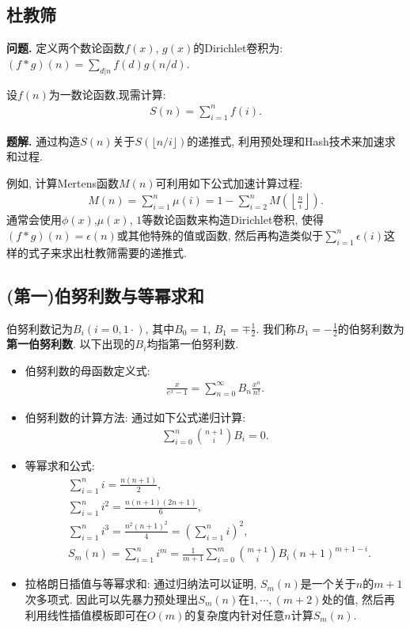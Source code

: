 \subsection{杜教筛}
\textbf{问题.}
定义两个数论函数$f(x)$, $g(x)$的Dirichlet卷积为:
$(f * g)(n) = \sum_{d|n} f(d) g\left( n/d \right)$.

设$f(n)$为一数论函数,现需计算:
\begin{gather*}
    S(n) = \sum_{i=1}^n f(i).
\end{gather*}

\textbf{题解.}
通过构造$S(n)$关于$S(\lfloor n/i \rfloor)$的递推式, 利用预处理和Hash技术来加速求和过程.

例如, 计算Mertens函数$M(n)$可利用如下公式加速计算过程:
\begin{gather*}
    M(n) = \sum_{i=1}^n \mu(i) = 1 - \sum_{i=2}^n M\left(\left\lfloor \frac{n}{i} \right\rfloor\right).
\end{gather*}
通常会使用$\phi(x)$,$\mu(x)$, $1$等数论函数来构造Dirichlet卷积, 使得$(f * g)(n) = \epsilon(n)$或其他特殊的值或函数, 然后再构造类似于$\sum_{i=1}^n \epsilon(i)$这样的式子来求出杜教筛需要的递推式.


\subsection{(第一)伯努利数与等幂求和}
伯努利数记为$B_i (i=0,1\cdot)$, 其中$B_0=1$, $B_1=\mp \frac{1}{2}$.
我们称$B_1 = -\frac{1}{2}$的伯努利数为\textbf{第一伯努利数}.
以下出现的$B_i$均指第一伯努利数.
\begin{itemize}
\item
伯努利数的母函数定义式:
\begin{gather*}
    \frac{x}{e^x - 1} = \sum_{n=0}^\infty B_n \frac{x^n}{n!}.
\end{gather*}

\item
伯努利数的计算方法: 通过如下公式递归计算:
\begin{gather*}
    \sum_{i=0}^n \binom{n+1}{i} B_i = 0.
\end{gather*}

\item
等幂求和公式:
\begin{align*}
    & \sum_{i=1}^{n}{i} = \frac{n(n+1)}{2}, \\
    & \sum_{i=1}^{n}{i^2} = \frac{n(n+1)(2n+1)}{6}, \\
    & \sum_{i=1}^{n}{i^3} = \frac{n^{2}(n+1)^{2}}{4} = \left(\sum_{i=1}^{n}{i} \right)^{2}, \\
    & S_m(n) = \sum_{i=1}^n i^m = \frac{1}{m+1} \sum_{i=0}^m \binom{m+1}{i} B_i (n+1)^{m+1-i}.
\end{align*}

\item
拉格朗日插值与等幂求和: 通过归纳法可以证明, $S_m(n)$是一个关于$n$的$m+1$次多项式.
因此可以先暴力预处理出$S_m(n)$在$1, \cdots, (m+2)$处的值, 然后再利用线性插值模板即可在$O(m)$的复杂度内针对任意$n$计算$S_m(n)$.
\end{itemize}


